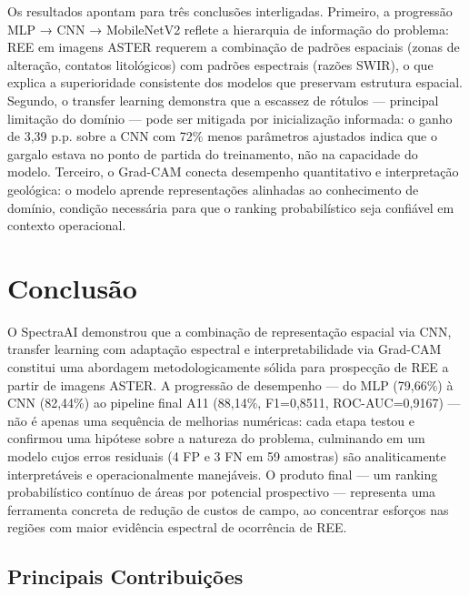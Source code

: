 \documentclass[12pt,twocolumn]{article}
\begin{document}
Os resultados apontam para três conclusões interligadas. Primeiro, a progressão MLP → CNN → MobileNetV2 reflete a hierarquia de informação do problema: REE em imagens ASTER requerem a combinação de padrões espaciais (zonas de alteração, contatos litológicos) com padrões espectrais (razões SWIR), o que explica a superioridade consistente dos modelos que preservam estrutura espacial. Segundo, o transfer learning demonstra que a escassez de rótulos --- principal limitação do domínio --- pode ser mitigada por inicialização informada: o ganho de 3,39 p.p. sobre a CNN com 72\% menos parâmetros ajustados indica que o gargalo estava no ponto de partida do treinamento, não na capacidade do modelo. Terceiro, o Grad-CAM conecta desempenho quantitativo e interpretação geológica: o modelo aprende representações alinhadas ao conhecimento de domínio, condição necessária para que o ranking probabilístico seja confiável em contexto operacional.

\section{Conclusão}\label{conclusuxe3o}


O SpectraAI demonstrou que a combinação de representação espacial via CNN, transfer learning com adaptação espectral e interpretabilidade via Grad-CAM constitui uma abordagem metodologicamente sólida para prospecção de REE a partir de imagens ASTER. A progressão de desempenho --- do MLP (79,66\%) à CNN (82,44\%) ao pipeline final A11 (88,14\%, F1=0,8511, ROC-AUC=0,9167) --- não é apenas uma sequência de melhorias numéricas: cada etapa testou e confirmou uma hipótese sobre a natureza do problema, culminando em um modelo cujos erros residuais (4 FP e 3 FN em 59 amostras) são analiticamente interpretáveis e operacionalmente manejáveis. O produto final --- um ranking probabilístico contínuo de áreas por potencial prospectivo --- representa uma ferramenta concreta de redução de custos de campo, ao concentrar esforços nas regiões com maior evidência espectral de ocorrência de REE.

\subsection{Principais Contribuições}\label{principais-contribuiuxe7uxf5es}
\end{document}
